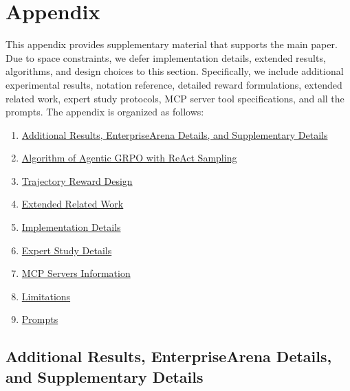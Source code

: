 \documentclass{article}
\theoremstyle{plain}
\theoremstyle{definition}
\theoremstyle{remark}
\begin{document}



\newpage
\appendix
\onecolumn


\section{Appendix}

\noindent This appendix provides supplementary material that supports the main paper. Due to space constraints, we defer implementation details, extended results, algorithms, and design choices to this section. Specifically, we include additional experimental results, notation reference, detailed reward formulations, extended related work, expert study protocols, MCP server tool specifications, and all the prompts. The appendix is organized as follows:


\begin{enumerate}[nosep]
    \item \hyperref[app:add_res]{Additional Results, EnterpriseArena Details, and Supplementary Details}
    \item \hyperref[app:algo]{Algorithm of Agentic GRPO with ReAct Sampling}
    \item \hyperref[app:reward]{Trajectory Reward Design}
    \item \hyperref[app:extended_related_work]{Extended Related Work}
    \item \hyperref[app:implementation]{Implementation Details}
    \item \hyperref[app:exp_study]{Expert Study Details}
    \item \hyperref[app:mcp_desc]{MCP Servers Information}
    \item \hyperref[app:lim]{Limitations}
    \item \hyperref[app:prompt]{Prompts}
\end{enumerate}

\subsection{Additional Results, EnterpriseArena Details, and Supplementary Details}
\label{app:add_res}
\end{document}
